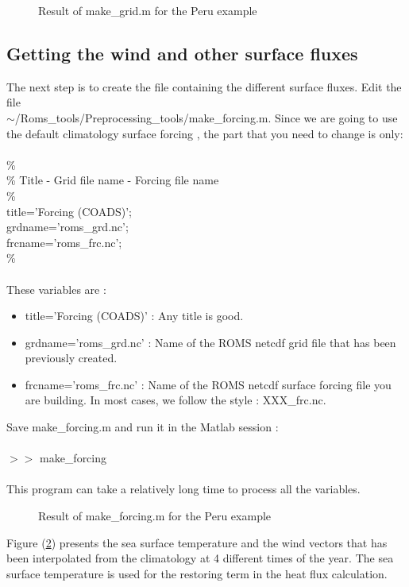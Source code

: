 \begin{figure}[h!]
\centerline{}
\caption{Result of make\_grid.m for the Peru example}
\label{fig:grid}
\end{figure}

\subsection{Getting the wind and other surface fluxes}

The next step is to create the file containing the different surface
fluxes. Edit the file\\
$\sim$/Roms\_tools/Preprocessing\_tools/make\_forcing.m.
Since we are going to use the default climatology surface forcing \citep{Das94},
the part that you need to change is only: 
\\ \\
\%\\
\%  Title - Grid file name - Forcing file name \\
\% \\
title='Forcing (COADS)'; \\
grdname='roms\_grd.nc'; \\
frcname='roms\_frc.nc'; \\
\% \\
\\
These variables are :
\begin{itemize}
\item title='Forcing (COADS)' : Any title is good.
\item grdname='roms\_grd.nc' : Name of the ROMS netcdf grid file 
that has been previously created. 
\item frcname='roms\_frc.nc' : Name of the ROMS netcdf surface forcing file  you are 
building. In most cases, we follow the style : XXX\_frc.nc.
\end{itemize}

Save make\_forcing.m and run it in the Matlab session :
\\ \\
$>>$ make\_forcing
\\ \\
This program can take a relatively long time to process all the variables.
\begin{figure}[h!]
\centerline{}
\caption{Result of make\_forcing.m for the Peru example}
\label{fig:forcing}
\end{figure}
Figure (\ref{fig:forcing}) presents the
sea surface temperature and the wind vectors that has
been interpolated from the climatology \citep{Das94}
at 4 different times of the year.
The sea surface temperature is used for the restoring term
in the heat flux calculation. 

